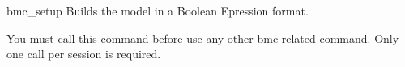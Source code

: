 \begin{nusmvCommand} {bmc\_setup} {Builds the model in a Boolean Epression format.}


You must call this command before use any other bmc-related command.
Only one call per session is required.

\end{nusmvCommand}
